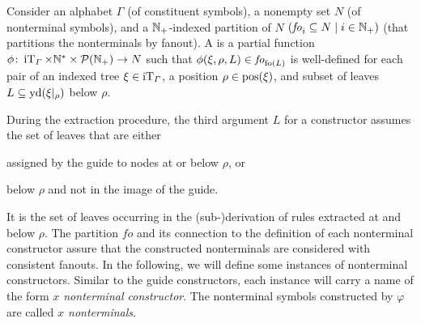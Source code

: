 \documentclass[../../document.tex]{subfiles}
\begin{document}
    \begin{definition}
        Consider an alphabet \(\varGamma\) (of constituent symbols), a nonempty set \(N\) (of nonterminal symbols), and a \(\mathbb{N}_+\)-indexed partition of \(N\) \((\mathit{fo}_i \subseteq N \mid i \in \mathbb{N}_+)\) (that partitions the nonterminals by fanout).
        A  is a partial function \(\phi\colon \operatorname{iT}_\varGamma \times \mathbb{N}^* \times \mathcal{P}(\mathbb{N}_+) \to N\) such that \(\phi(\xi, \rho, L) \in \mathit{fo}_{\operatorname{fo}(L)}\) is well-defined for each pair of an indexed tree \(\xi \in \operatorname{iT}_\varGamma\), a position \(\rho \in \operatorname{pos}(\xi)\), and subset of leaves \(L \subseteq \operatorname{yd}(\xi|_\rho)\) below \(\rho\).
    \end{definition}


    During the extraction procedure, the third argument \(L\) for a constructor assumes the set of leaves that are either
    \begin{inparaenum}
        \item assigned by the guide to nodes at or below \(\rho\), or
        \item below \(\rho\) and not in the image of the guide.
    \end{inparaenum}
    It is the set of leaves occurring in the (sub-)derivation of rules extracted at and below \(\rho\).
    The partition \(\mathit{fo}\) and its connection to the definition of each nonterminal constructor assure that the constructed nonterminals are considered with consistent fanouts.
    In the following, we will define some instances of nonterminal constructors.
    Similar to the guide constructors, each instance will carry a name of the form \emph{\(x\) nonterminal constructor}.
    The nonterminal symbols constructed by \(\varphi\) are called \emph{\(x\) nonterminals}.
\end{document}
